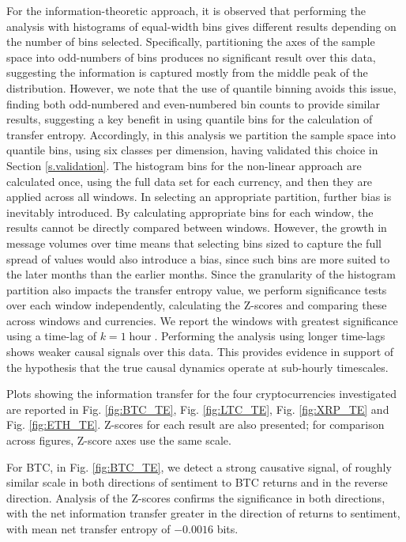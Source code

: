 \documentclass[]{rsos}%
\begin{document}
{  For the information-theoretic approach, it is observed that performing the analysis with histograms of equal-width bins gives different results depending on the number of bins selected. Specifically, partitioning the axes of the sample space into odd-numbers of bins produces no significant result over this data, suggesting the information is captured mostly from the middle peak of the distribution. However, we note that the use of quantile binning avoids this issue, finding both odd-numbered and even-numbered bin counts to provide similar results, suggesting a key benefit in using quantile bins for the calculation of transfer entropy. Accordingly, in this analysis we partition the sample space into quantile bins, using six classes per dimension, having validated this choice in Section \ref{s.validation}. The histogram bins for the non-linear approach are calculated once, using the full data set for each currency, and then they are applied across all windows. In selecting an appropriate partition, further bias is inevitably introduced. By calculating appropriate bins for each window, the results cannot be directly compared between windows. However, the growth in message volumes over time means that selecting bins sized to capture the full spread of values would also introduce a bias, since such bins are more suited to the later months than the earlier months. Since the granularity of the histogram partition also impacts the transfer entropy value, we perform significance tests over each window independently, calculating the Z-scores and comparing these across windows and currencies.  We report the windows with greatest significance using a time-lag of $k=1\operatorname{hour}$. Performing the analysis using longer time-lags shows weaker causal signals over this data. This provides evidence in support of the hypothesis that the true causal dynamics operate at sub-hourly timescales.

  Plots showing the information transfer for the four cryptocurrencies investigated are reported in Fig. \ref{fig:BTC_TE}, Fig. \ref{fig:LTC_TE}, Fig. \ref{fig:XRP_TE} and Fig. \ref{fig:ETH_TE}. Z-scores for each result are also presented; for comparison across figures, Z-score axes  use the same scale.
  
  For BTC, in Fig. \ref{fig:BTC_TE}, we detect a strong causative signal, of roughly similar scale in both directions of sentiment to BTC returns and in the reverse direction. Analysis of the Z-scores confirms the significance in both directions, with the net information transfer greater in the direction of returns to sentiment, with mean net transfer entropy of $-0.0016$ bits.
  
}
\end{document}
